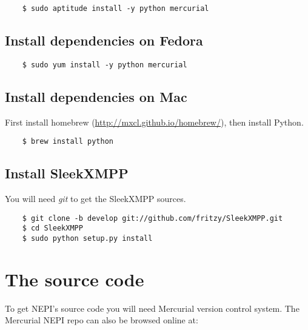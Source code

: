 \begin{verbatim}
    $ sudo aptitude install -y python mercurial
\end{verbatim}

\endgroup

\subsection{Install dependencies on Fedora}

\begingroup
    \fontsize{10pt}{12pt}\selectfont

\begin{verbatim}
    $ sudo yum install -y python mercurial
\end{verbatim}

\endgroup

\subsection{Install dependencies on Mac}

First install homebrew (\url{http://mxcl.github.io/homebrew/}),
then install Python.

\begingroup
    \fontsize{10pt}{12pt}\selectfont

\begin{verbatim}
    $ brew install python
\end{verbatim}

\endgroup

\subsection{Install SleekXMPP}

You will need \textit{git} to get the SleekXMPP sources.

\begingroup
    \fontsize{10pt}{12pt}\selectfont

\begin{verbatim}
    $ git clone -b develop git://github.com/fritzy/SleekXMPP.git
    $ cd SleekXMPP
    $ sudo python setup.py install
\end{verbatim}

\endgroup

\section{The source code}

To get NEPI's source code you will need Mercurial version 
control system. The Mercurial NEPI repo can also be browsed online at: \\

